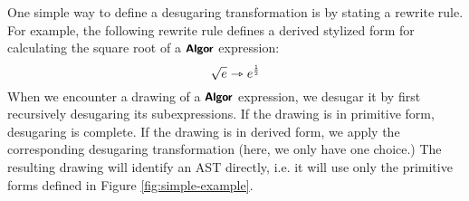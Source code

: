 One simple way to define a desugaring transformation is by stating a rewrite rule. For example, the following rewrite rule defines a derived stylized form for calculating the square root of a $\textsf{\textbf{\small Algor}}$ expression:
\begin{equation}\label{rule:simplelang-sqrt}
\sqrt{e} \rightarrowtriangle e^{\frac{\numintro{1}}{\numintro{2}}}
\end{equation}
When we encounter a drawing of a $\textsf{\textbf{\small Algor}}$ expression, we desugar  it by first recursively desugaring its subexpressions. If the drawing is in primitive form, desugaring is complete.  If the drawing is in derived form, we apply the corresponding desugaring transformation (here, we only have one choice.) The resulting drawing will identify an AST directly, i.e. it will use only the primitive forms defined in Figure \ref{fig:simple-example}.


